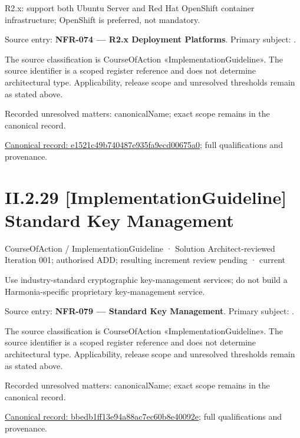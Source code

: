 R2.x: support both Ubuntu Server and Red Hat OpenShift container infrastructure; OpenShift is preferred, not mandatory.



Source entry: \textbf{NFR-074 — R2.x Deployment Platforms}. Primary subject: \texttt{}.



The source classification is CourseOfAction «ImplementationGuideline». The source identifier is a scoped register reference and does not determine architectural type. Applicability, release scope and unresolved thresholds remain as stated above.


{\small Recorded unresolved matters: canonicalName; exact scope remains in the canonical record.}\par
{\footnotesize \href{../../../../../../../continuum/strategy/course-of-action/implementation-guideline/e1521c49b740487e935fa9ecd00675a0.md}{Canonical record: e1521c49b740487e935fa9ecd00675a0}; full qualifications and provenance.}\par
\section*{II.2.29 [ImplementationGuideline] Standard Key Management}
\label{navigation:II.2.29}

\label{element:bbedb1ff13e94a88ac7ec60b8e40092e}
{\small CourseOfAction / ImplementationGuideline · Solution Architect-reviewed Iteration 001; authorised ADD; resulting increment review pending · current}\par

Use industry-standard cryptographic key-management services; do not build a Harmonia-specific proprietary key-management service.



Source entry: \textbf{NFR-079 — Standard Key Management}. Primary subject: \texttt{}.



The source classification is CourseOfAction «ImplementationGuideline». The source identifier is a scoped register reference and does not determine architectural type. Applicability, release scope and unresolved thresholds remain as stated above.


{\small Recorded unresolved matters: canonicalName; exact scope remains in the canonical record.}\par
{\footnotesize \href{../../../../../../../continuum/strategy/course-of-action/implementation-guideline/bbedb1ff13e94a88ac7ec60b8e40092e.md}{Canonical record: bbedb1ff13e94a88ac7ec60b8e40092e}; full qualifications and provenance.}\par
